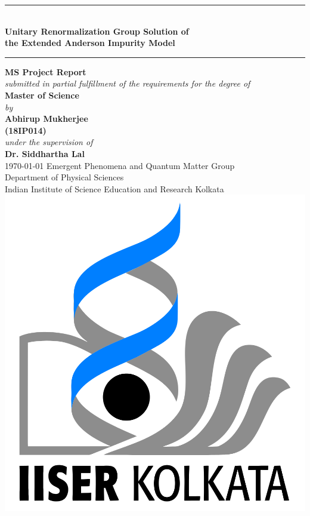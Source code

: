 \begin{titlepage}
	\centering
	\rule{\textwidth}{3pt}\\
	\vspace*{20pt}
	{
		\textbf{\LARGE Unitary Renormalization Group Solution of}\\[10pt]
		\textbf{\LARGE the Extended Anderson Impurity Model}\\[10pt]
	}
	\rule{\textwidth}{3pt} %
	\vfill
	{\Large \textbf{MS Project Report}}\\
	\vfill
	\textit{\large{ submitted in partial fulfillment of the requirements for the degree of }}\\
	\vfill
	{\Large \textbf{Master of Science\\}}
	\vfill
	\textit{\large by \\}
	\vfill
	{\Large \textbf{Abhirup Mukherjee \\}
	\vspace*{5pt}
	\textbf{(18IP014)\\}
	\vfill
	\textit{\large under the supervision of \\}
	\vfill
	{\Large \textbf{Dr. Siddhartha Lal}\\
	\vfill
	\today
	\vfill
	Emergent Phenomena and Quantum Matter Group\\
	\vspace{0.01\textheight}
	Department of Physical Sciences\\
	\vspace{0.01\textheight}
	Indian Institute of Science Education and Research Kolkata\\}}
	\vfill
	\includegraphics[scale=0.15]{../figures/logo.png}\\
\end{titlepage}
